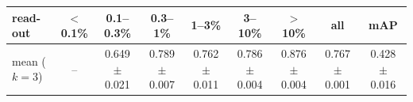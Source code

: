 \begin{tabular}{lcccccccc}
\toprule
read-out & $<$0.1\% & 0.1--0.3\% & 0.3--1\% & 1--3\% & 3--10\% & $>$10\% & all & mAP \\
\midrule
mean ($k=3$) & -- & 0.649 $\pm$ 0.021 & 0.789 $\pm$ 0.007 & 0.762 $\pm$ 0.011 & 0.786 $\pm$ 0.004 & 0.876 $\pm$ 0.004 & 0.767 $\pm$ 0.001 & 0.428 $\pm$ 0.016 \\
\bottomrule
\end{tabular}

